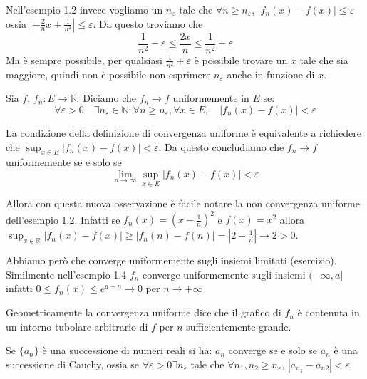 Nell'esempio 1.2 invece vogliamo un \(n_\varepsilon\) tale che \(\forall n\ge
n_\varepsilon\), \(|f_{n}(x) - f(x)| \le \varepsilon\) ossia \(|-\frac{2}{n} x +
\frac{1}{n^2} | \le  \varepsilon\). Da questo troviamo che
\[
    \frac{1}{n^2} - \varepsilon \le \frac{2x}{n} \le \frac{1}{n^2} + \varepsilon
\]
Ma è sempre possibile, per qualsiasi \(\frac{1}{n^2} + \varepsilon\) è
possibile trovare un \(x\) tale che sia maggiore, quindi non è possibile non
esprimere \(n_\varepsilon\) anche in funzione di \(x\).

\begin{definition}
    Sia \(f\), \(f_{n} : E \to \mathbb{R}\). Diciamo che \(f_{n} \to f\)
    uniformemente in \(E\) se:
    \[
        \forall \varepsilon > 0 \quad \exists n_\varepsilon \in \mathbb{N} :
        \forall n \ge n_\varepsilon, \forall x \in E, \quad |f_{n}(x) - f(x)| <
        \varepsilon
    \]
\end{definition}
\begin{remark}
    La condizione della definizione di convergenza uniforme è equivalente a
    richiedere che \(\sup_{x \in E} |f_n(x) - f(x)| < \varepsilon\). Da questo
    concludiamo che \(f_{n} \to f\) uniformemente se e solo se
    \[
        \lim_{n \to \infty} \sup_{x \in E} |f_{n}(x) - f(x)| <\varepsilon
    \]
\end{remark}
Allora con questa nuova osservazione è facile notare la non convergenza uniforme
dell'esempio 1.2. Infatti se \(f_{n}(x) = {(x-\frac{1}{n})}^2\) e \(f(x) = x^2\)
allora \(\sup_{x \in \mathbb{R}} |f_{n}(x) - f(x)| \ge |f_n(n) - f(n)| = |2 -
\frac{1}{n}| \to 2 > 0\).

Abbiamo però che converge uniformemente sugli insiemi limitati (esercizio).
Similmente nell'esempio 1.4 \(f_{n}\) converge uniformemente sugli insiemi
\((-\infty, a]\) infatti \(0 \le f_{n}(x) \le e^{a-n} \to 0\) per \(n \to +\infty\) 

Geometricamente la convergenza uniforme dice che il grafico di \(f_{n}\) è
contenuta in un intorno tubolare arbitrario di \(f\) per \(n\) sufficientemente
grande.

\begin{proposition}
    Se \(\{a_{n}\} \) è una successione di numeri reali si ha:
    \(a_{n}\) converge se e solo se \(a_{n}\) è una successione di Cauchy, ossia
    se \(\forall \varepsilon > 0 \exists n_\varepsilon\) tale che \(\forall
    n_{1},n_{2} \ge n_\varepsilon\), \(|a_{n_{1}} - a_{n2}| <\varepsilon\) 
\end{proposition}

